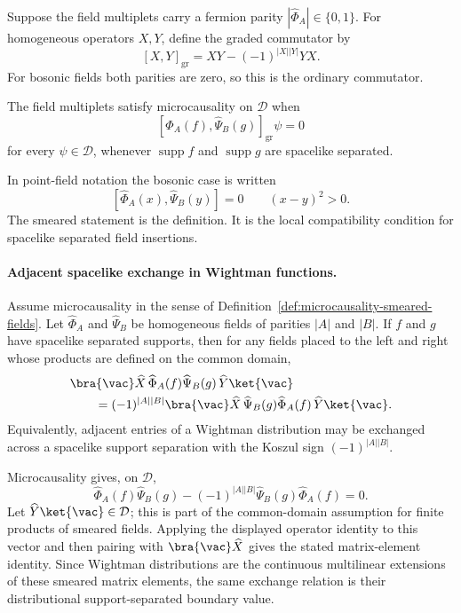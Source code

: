 \begin{definition}
\label{def:homogeneous-parity-graded-commutator}
Suppose the field multiplets carry a fermion parity \(|\widehat\Phi_A|\in
\{0,1\}\). For homogeneous operators \(X,Y\), define the graded commutator by
\[
  [X,Y]_{\mathrm{gr}}
  =
  XY-(-1)^{|X||Y|}YX.
\]
For bosonic fields both parities are zero, so this is the ordinary
commutator.
\end{definition}

\begin{definition}
\label{def:microcausality-smeared-fields}
The field multiplets satisfy microcausality on \(\mathcal D\) when
\[
  [\widehat\Phi_A(f),\widehat\Psi_B(g)]_{\mathrm{gr}}\psi=0
\]
for every \(\psi\in\mathcal D\), whenever
\(\operatorname{supp}f\) and \(\operatorname{supp}g\) are spacelike separated.
\end{definition}

In point-field notation the bosonic case is written
\[
  [\widehat\Phi_A(x),\widehat\Psi_B(y)]=0
  \qquad
  (x-y)^2>0.
\]
The smeared statement is the definition. It is the local compatibility
condition for spacelike separated field insertions.

\paragraph{Adjacent spacelike exchange in Wightman functions.}
Assume microcausality in the sense of
Definition~\ref{def:microcausality-smeared-fields}.  Let
\(\widehat\Phi_A\) and \(\widehat\Psi_B\) be homogeneous fields of parities
\(|A|\) and \(|B|\).  If \(f\) and \(g\) have spacelike separated supports,
then for any fields placed to the left and right whose products are defined
on the common domain,
\[
\begin{split}
  &\bra{\vac}
  \widehat X\,
  \widehat\Phi_A(f)\widehat\Psi_B(g)\,
  \widehat Y
  \ket{\vac}
\\
  &\qquad =
  (-1)^{|A||B|}
  \bra{\vac}
  \widehat X\,
  \widehat\Psi_B(g)\widehat\Phi_A(f)\,
  \widehat Y
  \ket{\vac}.
\end{split}
\]
Equivalently, adjacent entries of a Wightman distribution may be exchanged
across a spacelike support separation with the Koszul sign
\((-1)^{|A||B|}\).

Microcausality gives, on \(\mathcal D\),
\[
  \widehat\Phi_A(f)\widehat\Psi_B(g)
  -
  (-1)^{|A||B|}
  \widehat\Psi_B(g)\widehat\Phi_A(f)=0 .
\]
Let \(\widehat Y\ket{\vac}\in\mathcal D\); this is part of the common-domain
assumption for finite products of smeared fields.  Applying the displayed
operator identity to this vector and then pairing with
\(\bra{\vac}\widehat X\) gives the stated matrix-element identity.  Since
Wightman distributions are the continuous multilinear extensions of these
smeared matrix elements, the same exchange relation is their distributional
support-separated boundary value.

